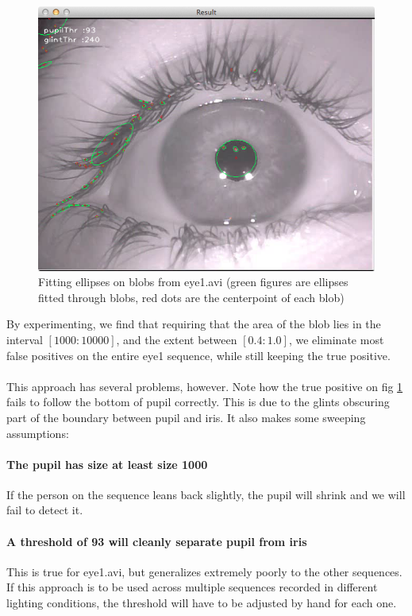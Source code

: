 \documentclass[a4paper,11pt]{article}
\begin{document}
\begin{figure}[ht]
  \centering
  \includegraphics[scale=0.3]{eye1_unfiltered}
  \caption{Fitting ellipses on blobs from eye1.avi (green figures are ellipses fitted through blobs, red dots are the centerpoint of each blob)}
  \label{fig:eye1_unfiltered}
\end{figure}

By experimenting, we find that requiring that the area of the blob lies in the interval $[1000:10000]$, and the extent between $[0.4:1.0]$, we eliminate most false positives on the entire eye1 sequence, while still keeping the true positive.

\paragraph{}
This approach has several problems, however. Note how the true positive on fig \ref{fig:eye1_unfiltered} fails to follow the bottom of pupil correctly. This is due to the glints obscuring part of the boundary between pupil and iris. It also makes some sweeping assumptions:

\paragraph{The pupil has size at least size 1000}
If the person on the sequence leans back slightly, the pupil will shrink and we will fail to detect it.

\paragraph{A threshold of 93 will cleanly separate pupil from iris}
This is true for eye1.avi, but generalizes extremely poorly to the other sequences. If this approach is to be used across multiple sequences recorded in different lighting conditions, the threshold will have to be adjusted by hand for each one.
\end{document}

